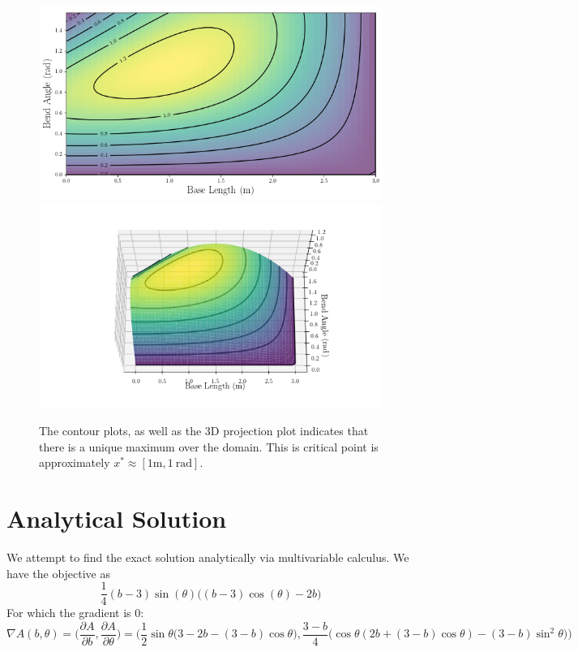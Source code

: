 \documentclass{article}
\begin{document}
\begin{figure}[h]
\includegraphics[scale = 0.43]{2dplot.png}
\includegraphics[trim = {3cm, 1cm, 3cm, 1.5cm}, clip, scale = 0.53]{3dplot.png}
\caption{The contour plots, as well as the 3D projection plot indicates that there is a unique maximum over the domain. This is critical point is approximately $x^* \approx [1 \textrm{m},1 \ \textrm{rad} ]$.}
\end{figure}





\newpage
\section*{Analytical Solution}
We attempt to find the exact solution analytically via multivariable calculus. We have the objective  as
$$\frac{1}{4}(b-3) \sin(\theta) \big((b-3)\cos(\theta) - 2b \big)$$
For which the gradient is 0:
$$ \nabla A(b,\theta) = \bigg(\frac{\partial A}{\partial b}, \frac{\partial A}{\partial \theta} \bigg) = \bigg(\frac{1}{2} \sin \theta \big(3 - 2b - (3-b)\cos \theta),  \frac{3-b}{4} \big (\cos \theta (2b + (3-b)\cos \theta ) - (3-b) \sin^2 \theta \big)  \bigg)$$
\end{document}
